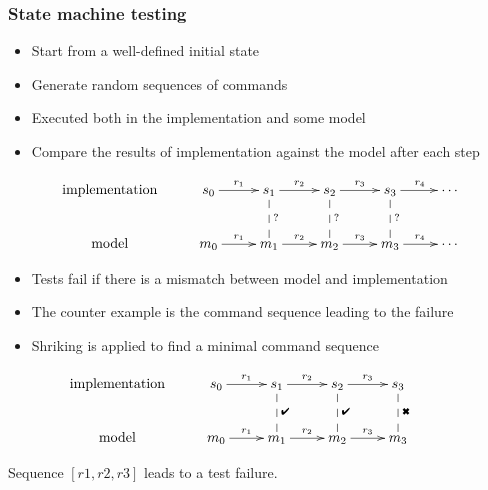 \documentclass{beamer}
\newcommand{\checkmak}{\text{\ding{52}}}
\newcommand{\crossmak}{\text{\ding{54}}}
\begin{document}
\begin{frame}[allowframebreaks]
  \frametitle{State machine testing}

  \begin{itemize}
  \item Start from a well-defined initial state
  \item Generate random sequences of commands
  \item Executed  both in the \alert{implementation} and 
    some \alert{model}
  \item Compare the results of implementation against the model
    after each step
\end{itemize}

\[\xymatrix{
    \text{implementation} &
    s_0 \ar[r]^{r_1} & s_1\ar[r]^{r_2}\ar@{--}[d]^{?} & s_2\ar[r]^{r_3}\ar@{--}[d]^{?} & s_3\ar[r]^{r_4}\ar@{--}[d]^{?} & \cdots \\
    \text{model} & 
    m_0\ar[r]^{r_1} & m_1\ar[r]^{r_2} & m_2\ar[r]^{r_3} & m_3\ar[r]^{r_4} & \cdots
  }
\]

\framebreak

\begin{itemize}
\item Tests fail if there is a mismatch between model and implementation
\item The counter example is the \alert{command sequence} leading to the failure
\item Shriking is applied to find a minimal command sequence 
\end{itemize}
 
\[ \xymatrix{
    \text{implementation} &
    s_0 \ar[r]^{r_1} & s_1\ar[r]^{r_2}\ar@{--}[d]^{\checkmak} & s_2\ar[r]^{r_3}\ar@{--}[d]^{\checkmak} & s_3\ar@{--}[d]^{\crossmak} &  \\
    \text{model} & 
    m_0\ar[r]^{r_1} & m_1\ar[r]^{r_2} & m_2\ar[r]^{r_3} & m_3 & 
  }
\]

\begin{center}
  Sequence $[r1,r2,r3]$ leads to a test failure.
  \end{center}

\end{frame}
\end{document}
